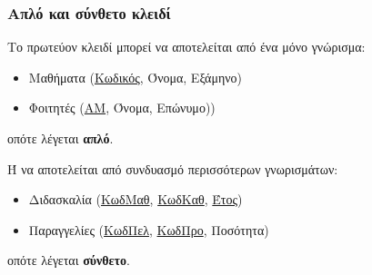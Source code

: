 \begin{frame}[t, fragile]
\frametitle{Απλό και σύνθετο κλειδί}
\begin{minipage}{0.94\textwidth}
  \begin{block}{Το πρωτεύον κλειδί μπορεί να αποτελείται από ένα μόνο γνώρισμα:}
    \begin{itemize}
      \item Μαθήματα (\underline{Κωδικός}, Όνομα, Εξάμηνο)
      \item Φοιτητές (\underline{ΑΜ}, Όνομα, Επώνυμο))   
    \end{itemize}
    οπότε λέγεται {\bf\color{red}απλό}.
  \end{block}
  \begin{block}{Ή να αποτελείται από συνδυασμό περισσότερων γνωρισμάτων:}
    \begin{itemize}
      \item Διδασκαλία (\underline{ΚωδΜαθ}, \underline{ΚωδΚαθ}, \underline{Έτος})
      \item Παραγγελίες (\underline{ΚωδΠελ}, \underline{ΚωδΠρο}, Ποσότητα)   
    \end{itemize} 
        οπότε λέγεται {\bf\color{red}σύνθετο}.
  \end{block}
\end{minipage} 
\end{frame}



